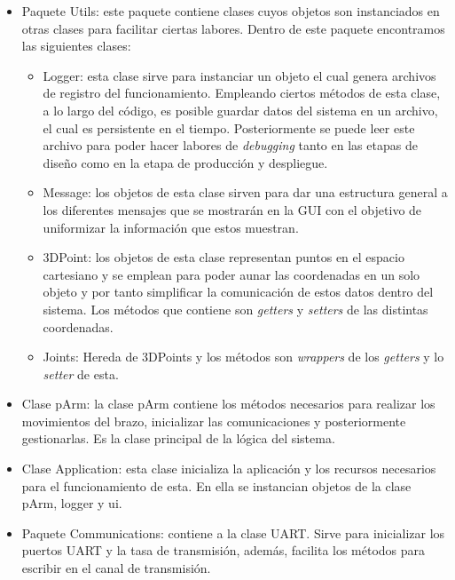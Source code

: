 \begin{itemize}
    \item Paquete Utils: este paquete contiene clases cuyos objetos son instanciados en otras clases para facilitar ciertas labores. Dentro de este paquete encontramos las siguientes clases:
    \begin{itemize}
        \item Logger: esta clase sirve para instanciar un objeto el cual genera archivos de registro del funcionamiento. Empleando ciertos métodos de esta clase, a lo largo del código, es posible guardar datos del sistema en un archivo, el cual es persistente en el tiempo. Posteriormente se puede leer este archivo para poder hacer labores de \textit{debugging} tanto en las etapas de diseño como en la etapa de producción y despliegue.
        \item Message: los objetos de esta clase sirven para dar una estructura general a los diferentes mensajes que se mostrarán en la GUI con el objetivo de uniformizar la información que estos muestran.
        \item 3DPoint: los objetos de esta clase representan puntos en el espacio cartesiano y se emplean para poder aunar las coordenadas en un solo objeto y por tanto simplificar la comunicación de estos datos dentro del sistema. Los métodos que contiene son \textit{getters} y \textit{setters} de las distintas coordenadas.
        \item Joints: Hereda de 3DPoints y los métodos son \textit{wrappers} de los \textit{getters} y lo \textit{setter} de esta.
    \end{itemize}
    \item Clase pArm: la clase pArm contiene los métodos necesarios para realizar los movimientos del brazo, inicializar las comunicaciones y posteriormente gestionarlas. Es la clase principal de la lógica del sistema.
    \item Clase Application: esta clase inicializa la aplicación y los recursos necesarios para el funcionamiento de esta. En ella se instancian objetos de la clase pArm, logger y ui.
    \item Paquete Communications: contiene a la clase UART. Sirve para inicializar los puertos UART y la tasa de transmisión, además, facilita los métodos para escribir en el canal de transmisión.
\end{itemize}

